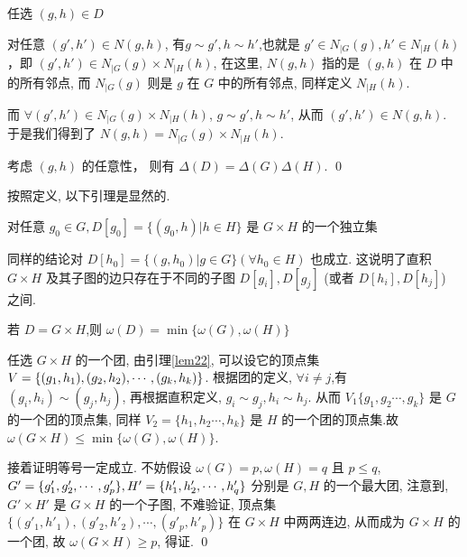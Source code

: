 \documentclass[12pt,a4paper]{article}%
\begin{document}
\begin{pf}
    任选 $(g,h) \in D$ 
    
    对任意 $ (g',h') \in N(g,h)$, 有$g \sim g', h \sim h'$,也就是 $g' \in N_{|G}(g), h' \in N_{|H}(h)$，即 $(g',h') \in N_{|G}(g) \times N_{|H}(h)$, 在这里, $N(g,h)$ 指的是 $(g,h)$ 在 $D$ 中的所有邻点, 而 $N_{|G}(g)$ 则是 $g$ 在 $G$ 中的所有邻点, 同样定义 $N_{|H}(h)$. 
    
    而 $\forall (g',h') \in N_{|G}(g) \times N_{|H}(h)$, $g \sim g', h \sim h'$, 从而 $(g',h') \in N(g,h)$.
    于是我们得到了 $N(g,h) = N_{|G}(g) \times N_{|H}(h)$.
    
    考虑 $(g,h)$ 的任意性， 则有 $\Delta(D) = \Delta(G) \Delta(H)$. \qed
\end{pf}

按照定义, 以下引理是显然的.

\begin{lemma}\label{lem22}
    对任意 $ g_0 \in G, D[g_0] = \{(g_0,h) | h \in H\}$ 是 $G \times H$ 的一个独立集
\end{lemma}

同样的结论对 $D[h_0] = \{(g,h_0) | g \in G\} (\forall h_0 \in H)$ 也成立. 这说明了直积 $G \times H$ 及其子图的边只存在于不同的子图 $D[g_i],D[g_j]$ (或者 $D[h_i],D[h_j]$) 之间. 

\begin{lemma}\label{lem23}
    若 $D = G \times H$,则 $\omega(D) = \min \{\omega(G), \omega(H)\}$
\end{lemma}

\begin{pf}
    任选 $G \times H$ 的一个团, 由引理\ref{lem22}, 可以设它的顶点集 $V = \{(g_1,h_1), (g_2,h_2), \cdots,\\ (g_k,h_k)\}$. 根据团的定义, $\forall i \neq j$,有 $(g_i,h_i) \sim (g_j,h_j)$, 再根据直积定义, $g_i \sim g_j, h_i \sim h_j$. 从而 $V_1\{g_1, g_2 \cdots, g_k\}$ 是 $G$ 的一个团的顶点集, 同样 $V_2 = \{h_1, h_2 \cdots, h_k\}$ 是 $H$ 的一个团的顶点集.故 $\omega(G \times H) \leq \min \{\omega(G), \omega(H)\}$. 

    接着证明等号一定成立. 不妨假设 $\omega(G) = p, \omega(H) = q$ 且 $p \leq q$, $G' = \{g'_1, g'_2, \cdots, g'_p\},\\ H' = \{h'_1, h'_2, \cdots, h'_q\}$ 分别是 $G, H$ 的一个最大团, 注意到, $G' \times H'$ 是 $G \times H$ 的一个子图, 不难验证, 顶点集 $\{(g'_1,h'_1), (g'_2,h'_2), \cdots, (g'_p, h'_p)\}$ 在 $G \times H$ 中两两连边, 从而成为 $G \times H$ 的一个团, 故 $\omega(G \times H) \geq p$, 得证. \qed 
\end{pf}
\end{document}
